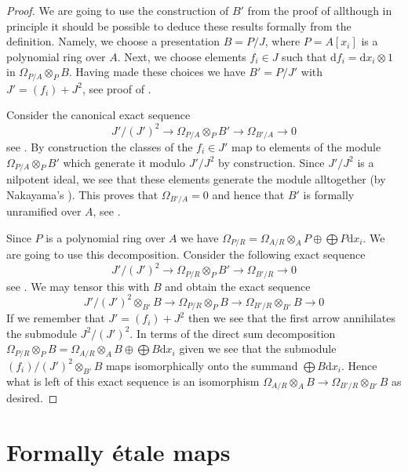 \begin{proof}
We are going to use the construction of $B'$ from the proof of
allthough in principle it should be possible to deduce these results
formally from the definition. Namely, we choose a presentation
$B = P/J$, where $P = A[x_i]$ is a polynomial ring over $A$.
Next, we choose elements $f_i \in J$ such that
$\text{d}f_i = \text{d}x_i \otimes 1$ in $\Omega_{P/A} \otimes_P B$.
Having made these choices we have
$B' = P/J'$ with $J' = (f_i) + J^2$, see proof of
.

\medskip\noindent
Consider the canonical exact sequence
$$
J'/(J')^2 \to \Omega_{P/A} \otimes_P B' \to \Omega_{B'/A} \to 0
$$
see
.
By construction the classes of the $f_i \in J'$ map to elements of
the module $\Omega_{P/A} \otimes_P B'$ which generate it modulo
$J'/J^2$ by construction. Since $J'/J^2$ is a nilpotent ideal, we see
that these elements generate the module alltogether (by
Nakayama's ). This proves that $\Omega_{B'/A} = 0$
and hence that $B'$ is formally unramified over $A$, see
.

\medskip\noindent
Since $P$ is a polynomial ring over $A$ we have
$\Omega_{P/R} = \Omega_{A/R} \otimes_A P \oplus \bigoplus P\text{d}x_i$.
We are going to use this decomposition.
Consider the following exact sequence
$$
J'/(J')^2 \to
\Omega_{P/R} \otimes_P B' \to
\Omega_{B'/R} \to 0
$$
see
.
We may tensor this with $B$ and obtain the exact sequence
$$
J'/(J')^2 \otimes_{B'} B \to
\Omega_{P/R} \otimes_P B \to
\Omega_{B'/R} \otimes_{B'} B \to 0
$$
If we remember that $J' = (f_i) + J^2$
then we see that the first arrow annihilates the submodule $J^2/(J')^2$.
In terms of the direct sum decomposition
$\Omega_{P/R} \otimes_P B =
\Omega_{A/R} \otimes_A B \oplus \bigoplus B\text{d}x_i $ given
we see that the submodule $(f_i)/(J')^2 \otimes_{B'} B$ maps
isomorphically onto the summand $\bigoplus B\text{d}x_i$. Hence what is
left of this exact sequence is an isomorphism
$\Omega_{A/R} \otimes_A B \to \Omega_{B'/R} \otimes_{B'} B$
as desired.
\end{proof}









\section{Formally \'etale maps}
\label{section-formally-etale}

